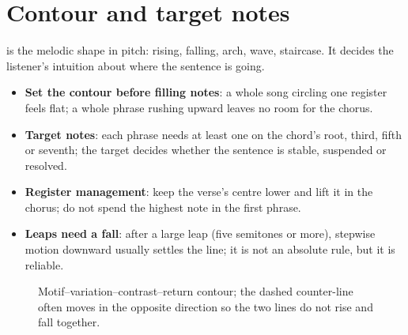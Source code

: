 \section{Contour and target notes}
\label{sec:contour}

 is the melodic shape in pitch: rising, falling, arch, wave, staircase. It decides the listener's intuition about where the sentence is going.

\begin{itemize}
\item \textbf{Set the contour before filling notes}: a whole song circling one register feels flat; a whole phrase rushing upward leaves no room for the chorus.
\item \textbf{Target notes}: each phrase needs at least one  on the chord's root, third, fifth or seventh; the target decides whether the sentence is stable, suspended or resolved.
\item \textbf{Register management}: keep the verse's centre lower and lift it in the chorus; do not spend the highest note in the first phrase.
\item \textbf{Leaps need a fall}: after a large leap (five semitones or more), stepwise motion downward usually settles the line; it is not an absolute rule, but it is reliable.
\end{itemize}

\begin{figure}[htbp]
  \centering
  \caption{Motif--variation--contrast--return contour; the dashed counter-line often moves in the opposite direction so the two lines do not rise and fall together.}
  \label{fig:melody-contour}
\end{figure}

